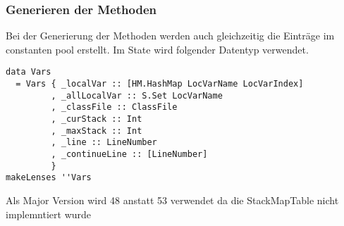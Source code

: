 \begin{frame}[fragile]
        \frametitle{Generieren der Methoden}
        Bei der Generierung der Methoden werden auch gleichzeitig die Einträge im constanten pool erstellt.  Im State wird folgender Datentyp verwendet.
        \begin{lstlisting}
data Vars
  = Vars { _localVar :: [HM.HashMap LocVarName LocVarIndex]
         , _allLocalVar :: S.Set LocVarName
         , _classFile :: ClassFile
         , _curStack :: Int
         , _maxStack :: Int
         , _line :: LineNumber
         , _continueLine :: [LineNumber]
         }
makeLenses ''Vars
        \end{lstlisting}
\end{frame}

\begin{frame}
        Als Major Version wird 48 anstatt 53 verwendet da die StackMapTable nicht implemntiert wurde
\end{frame}

